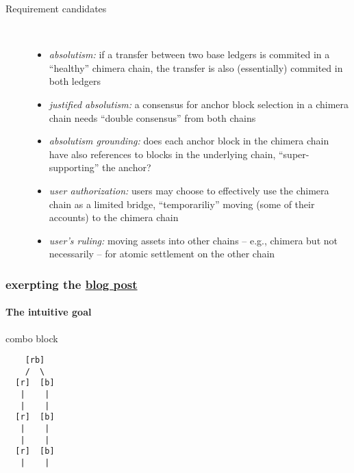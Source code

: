 \documentclass{article}
\theoremstyle{definition}
\begin{document}
\begin{description}
\item[Requirement candidates]~\\
  \begin{itemize}
  \item
    \emph{absolutism:}
    if a transfer between two base ledgers is commited
    in a “healthy” chimera chain, 
    the transfer is also (essentially) commited in both ledgers
  \item 
    \emph{justified absolutism:}
    a consensus for anchor block selection in a chimera chain
    needs “double consensus” from both chains 
    
  \item
    \emph{absolutism grounding:}
    does each anchor block in the chimera chain
    have also references to blocks in the underlying chain, 
    “super-supporting” the anchor?

  \item
    \emph{user authorization:}
    users may choose to effectively use
    the chimera chain as a limited bridge,
    “temporariliy” moving (some of their accounts)
    to the chimera chain
  \item
    \emph{user's ruling:}
    moving assets into other chains
    -- e.g., chimera but not necessarily --
    for atomic settlement on the other chain

    
  \end{itemize}
\end{description}


\subsubsection{exerpting the %
  \href{https://anoma.net/blog/heterogeneous-paxos-and-multi-chain-atomic-commits/}{%
    blog post%
  }
}
\label{sec:blog-post-excerpts}

\paragraph{The intuitive goal}

combo block

\begin{verbatim}
    [rb]
    /  \ 
  [r]  [b]
   |    |
   |    |
  [r]  [b]
   |    |
   |    |
  [r]  [b]
   |    |
\end{verbatim}
\end{document}
